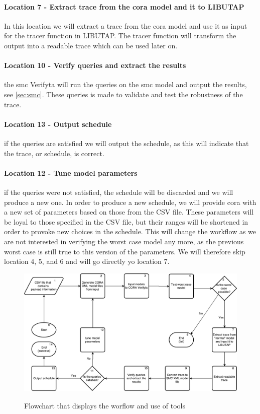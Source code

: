 \paragraph{Location 7 - Extract trace from the \gls{cora} model and it to LIBUTAP}
In this location we will extract a trace from the \gls{cora} model and use it as input for the tracer function in LIBUTAP. The tracer function will transform the output into a readable trace which can be used later on.


\paragraph{Location 10 - Verify queries and extract the results} the \gls{smc} Verifyta will run the queries on the \gls{smc} model and output the results, see \cref{sec:smc}. These queries is made to validate and test the robustness of the trace.

\paragraph{Location 13 - Output schedule} if the queries are satisfied we will output the schedule, as this will indicate that the trace, or schedule, is correct.

\paragraph{Location 12 - Tune model parameters} if the queries were not satisfied, the schedule will be discarded and we will produce a new one. In order to produce a new schedule, we will provide \gls{cora} with a new set of parameters based on those from the CSV file. These parameters will be loyal to those specified in the CSV file, but their ranges will be shortened in order to provoke new choices in the schedule. This will change the workflow as we are not interested in verifying the worst case model any more, as the previous worst case is still true to this version of the parameters. We will therefore skip location 4, 5, and 6 and will go directly yo location 7.

\begin{figure}
	\includegraphics[width=\textwidth]{graphics/tool_chain.pdf}
	\label{fig:tool_chain}
	\caption{Flowchart that displays the worflow and use of tools}
\end{figure}
